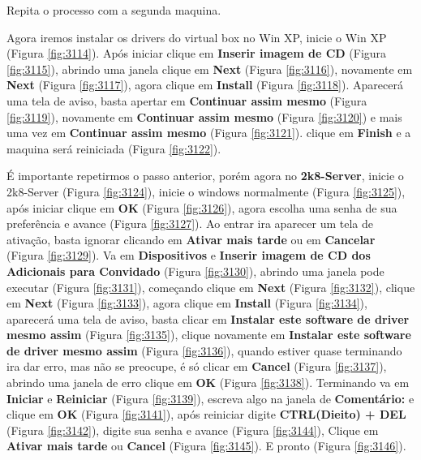 \documentclass[10pt]{article}
\begin{document}
\par Repita o processo com a segunda maquina.

\par Agora iremos instalar os drivers do virtual box no Win XP, inicie o Win XP (Figura \ref{fig:3114}). Após iniciar clique em \textbf{Inserir imagem de CD} (Figura \ref{fig:3115}), abrindo uma janela clique em \textbf{Next} (Figura \ref{fig:3116}), novamente em \textbf{Next} (Figura \ref{fig:3117}), agora clique em \textbf{Install} (Figura \ref{fig:3118}). Aparecerá uma tela de aviso, basta apertar em \textbf{Continuar assim mesmo} (Figura \ref{fig:3119}), novamente em \textbf{Continuar assim mesmo} (Figura \ref{fig:3120}) e mais uma vez em \textbf{Continuar assim mesmo} (Figura \ref{fig:3121}). clique em \textbf{Finish} e a maquina será reiniciada (Figura \ref{fig:3122}).

\par É importante repetirmos o passo anterior, porém agora no \textbf{2k8-Server}, inicie o 2k8-Server (Figura \ref{fig:3124}), inicie o windows normalmente (Figura \ref{fig:3125}), após iniciar clique em \textbf{OK} (Figura \ref{fig:3126}), agora escolha uma senha de sua preferência e avance (Figura \ref{fig:3127}). Ao entrar ira aparecer um tela de ativação, basta ignorar clicando em \textbf{Ativar mais tarde} ou em \textbf{Cancelar} (Figura \ref{fig:3129}). Va em \textbf{Dispositivos} e \textbf{Inserir imagem de CD dos Adicionais para Convidado} (Figura \ref{fig:3130}), abrindo uma janela pode executar (Figura \ref{fig:3131}), começando clique em \textbf{Next} (Figura \ref{fig:3132}), clique em \textbf{Next} (Figura \ref{fig:3133}), agora clique em \textbf{Install} (Figura \ref{fig:3134}), aparecerá uma tela de aviso, basta clicar em \textbf{Instalar este software de driver mesmo assim} (Figura \ref{fig:3135}), clique novamente em \textbf{Instalar este software de driver mesmo assim} (Figura \ref{fig:3136}), quando estiver quase terminando ira dar erro, mas não se preocupe, é só clicar em \textbf{Cancel} (Figura \ref{fig:3137}), abrindo uma janela de erro clique em \textbf{OK} (Figura \ref{fig:3138}). Terminando va em \textbf{Iniciar} e \textbf{Reiniciar} (Figura \ref{fig:3139}), escreva algo na janela de \textbf{Comentário:} e clique em \textbf{OK} (Figura \ref{fig:3141}), após reiniciar digite \textbf{CTRL(Dieito) + DEL} (Figura \ref{fig:3142}), digite sua senha e avance (Figura \ref{fig:3144}), Clique em \textbf{Ativar mais tarde} ou \textbf{Cancel} (Figura \ref{fig:3145}). E pronto (Figura \ref{fig:3146}).
\end{document}
